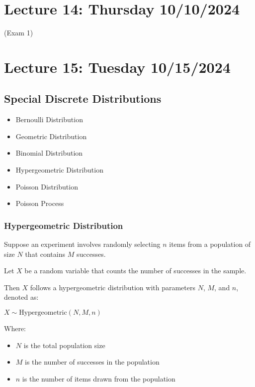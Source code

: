 \documentclass{article}
\begin{document}
    \section*{Lecture 14: Thursday 10/10/2024}

    (Exam 1)

    \pagebreak

    \section*{Lecture 15: Tuesday 10/15/2024}

    \subsection*{Special Discrete Distributions}

    \begin{itemize}
        \item Bernoulli Distribution
        \item Geometric Distribution
        \item Binomial Distribution
        \item Hypergeometric Distribution
        \item Poisson Distribution
        \item Poisson Process
    \end{itemize}

    \subsubsection*{Hypergeometric Distribution}

    Suppose an experiment involves randomly selecting $n$ items from a population of size $N$ that contains $M$ successes.

    Let $X$ be a random variable that counts the number of successes in the sample.

    Then $X$ follows a hypergeometric distribution with parameters $N$, $M$, and $n$, denoted as:

    $X \sim \text{Hypergeometric}(N, M, n)$

    Where:
    \begin{itemize}
        \item $N$ is the total population size
        \item $M$ is the number of successes in the population
        \item $n$ is the number of items drawn from the population
    \end{itemize}
\end{document}

